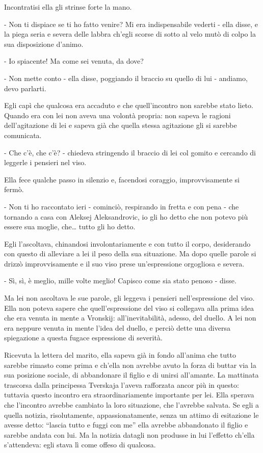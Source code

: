 Incontratisi ella gli strinse forte la mano. 

- Non ti dispiace se ti ho fatto venire? Mi era indispensabile vederti - ella disse, e la piega seria e severa delle labbra ch'egli scorse di sotto al velo mutò di colpo la sua disposizione d'animo. 

- Io spiacente! Ma come sei venuta, da dove? 

- Non mette conto - ella disse, poggiando il braccio su quello di lui - andiamo, devo parlarti. 

Egli capì che qualcosa era accaduto e che quell'incontro non sarebbe stato lieto. Quando era con lei non aveva una volontà propria: non sapeva le ragioni dell'agitazione di lei e sapeva già che quella stessa agitazione gli si sarebbe comunicata. 

- Che c'è, che c'è? - chiedeva stringendo il braccio di lei col gomito e cercando di leggerle i pensieri nel viso. 

Ella fece qualche passo in silenzio e, facendosi coraggio, improvvisamente si fermò. 

- Non ti ho raccontato ieri - cominciò, respirando in fretta e con pena - che tornando a casa con Aleksej Aleksandrovic, io gli ho detto che non potevo più essere sua moglie, che\ldots{} tutto gli ho detto. 

Egli l'ascoltava, chinandosi involontariamente e con tutto il corpo, desiderando con questo di alleviare a lei il peso della sua situazione. Ma dopo quelle parole si drizzò improvvisamente e il suo viso prese un'espressione orgogliosa e severa. 

- Sì, sì, è meglio, mille volte meglio! Capisco come sia stato penoso - disse. 

Ma lei non ascoltava le sue parole, gli leggeva i pensieri nell'espressione del viso. Ella non poteva sapere che quell'espressione del viso si collegava alla prima idea che era venuta in mente a Vronskij: all'inevitabilità, adesso, del duello. A lei non era neppure venuta in mente l'idea del duello, e perciò dette una diversa spiegazione a questa fugace espressione di severità. 

Ricevuta la lettera del marito, ella sapeva già in fondo all'anima che tutto sarebbe rimasto come prima e ch'ella non avrebbe avuto la forza di buttar via la sua posizione sociale, di abbandonare il figlio e di unirsi all'amante. La mattinata trascorsa dalla principessa Tverskaja l'aveva rafforzata ancor più in questo: tuttavia questo incontro era straordinariamente importante per lei. Ella sperava che l'incontro avrebbe cambiato la loro situazione, che l'avrebbe salvata. Se egli a quella notizia, risolutamente, appassionatamente, senza un attimo di esitazione le avesse detto: ``lascia tutto e fuggi con me'' ella avrebbe abbandonato il figlio e sarebbe andata con lui. Ma la notizia datagli non produsse in lui l'effetto ch'ella s'attendeva: egli stava lì come offeso di qualcosa. 

